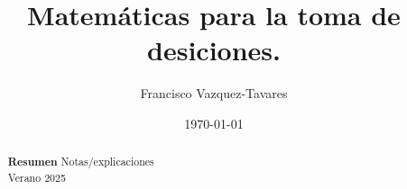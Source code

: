 \documentclass[a4paper]{tufte-handout} %
\title{Matemáticas para la toma de desiciones.}
\author{Francisco Vazquez-Tavares}
\date{\today} %
\begin{document}
\maketitle %


\begin{abstract}
	\textbf{Resumen}
        Notas/explicaciones\\
        Verano 2025
\end{abstract}



%
%
%
%
%


\nocite{*}


\end{document}
